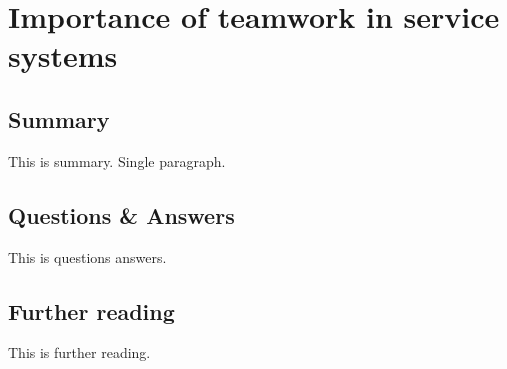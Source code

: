 \section{Importance of teamwork in service systems}

\subsection{Summary}
This is summary. Single paragraph.

\subsection{Questions \& Answers}
This is questions answers.

\subsection{Further reading}
This is further reading.
